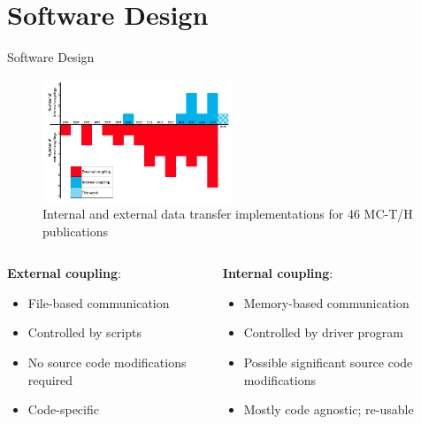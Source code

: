 \documentclass[10pt]{beamer}
\begin{document}
\section{Software Design}

\begin{frame}{Software Design}

\begin{figure}
\includegraphics[width=5.65cm]{../Figures/internal_vs_external.png}
\caption{Internal and external data transfer implementations for 46 MC-T/H publications}
\end{figure}

\begin{columns}[t]
\begin{column}{0.485\linewidth}
\color{red}\textbf{External coupling}\color{black}:
	\begin{itemize}
	\item File-based communication
	\item Controlled by scripts
	\item No source code modifications required
	\item Code-specific\newline
	\end{itemize}
\end{column}
\begin{column}{0.485\linewidth}
\color{cyan}\textbf{Internal coupling}\color{black}:
	\begin{itemize}
	\item Memory-based communication
	\item Controlled by driver program
	\item Possible significant source code modifications
	\item Mostly code agnostic; re-usable
	\end{itemize}
\end{column}
\end{columns}
\end{frame}
\end{document}
